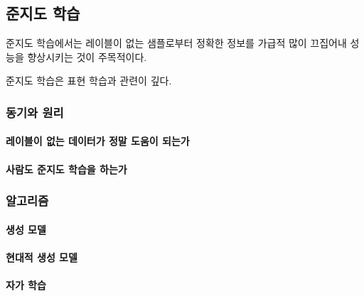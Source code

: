 \documentclass [12pt] {oblivoir}
\let\oldsubsubsection=\subsubsection
\renewcommand{\subsubsection}
{
  \filbreak
  \oldsubsubsection
}
\begin{document}
\vspace{3mm}

\subsection{준지도 학습}

준지도 학습에서는 레이블이 없는 샘플로부터 정확한 정보를 가급적 많이 끄집어내 성능을 향상시키는 것이 주목적이다.

준지도 학습은 표현 학습과 관련이 깊다.

\subsubsection{동기와 원리}

\paragraph*{레이블이 없는 데이터가 정말 도움이 되는가}\mbox{}

\vspace{3mm}

\paragraph*{사람도 준지도 학습을 하는가}\mbox{}

\vspace{3mm}

\subsubsection{알고리즘}

\paragraph*{생성 모델}\mbox{}

\vspace{3mm}

\paragraph*{현대적 생성 모델}\mbox{}

\vspace{3mm}

\paragraph*{자가 학습}\mbox{}

\vspace{3mm}
\end{document}
